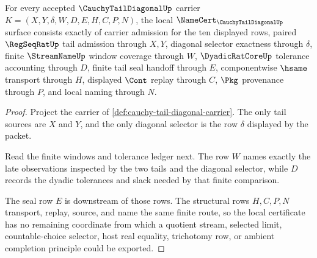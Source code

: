 \begin{theorem}\label{thm:cauchy-tail-diagonal-namecert-obligations}
For every accepted $\CauchyTailDiagonalUp$ carrier $K=(X,Y,\delta,W,D,E,H,C,P,N)$, the local $\NameCert_{\CauchyTailDiagonalUp}$ surface consists exactly of carrier admission for the ten displayed rows, paired $\RegSeqRatUp$ tail admission through $X,Y$, diagonal selector exactness through $\delta$, finite $\StreamNameUp$ window coverage through $W$, $\DyadicRatCoreUp$ tolerance accounting through $D$, finite tail seal handoff through $E$, componentwise $\hsame$ transport through $H$, displayed $\Cont$ replay through $C$, $\Pkg$ provenance through $P$, and local naming through $N$.
\end{theorem}
\begin{proof}
Project the carrier of \autoref{def:cauchy-tail-diagonal-carrier}. The only tail sources are $X$ and $Y$, and the only diagonal selector is the row $\delta$ displayed by the packet.

Read the finite windows and tolerance ledger next. The row $W$ names exactly the late observations inspected by the two tails and the diagonal selector, while $D$ records the dyadic tolerances and slack needed by that finite comparison.

The seal row $E$ is downstream of those rows. The structural rows $H,C,P,N$ transport, replay, source, and name the same finite route, so the local certificate has no remaining coordinate from which a quotient stream, selected limit, countable-choice selector, host real equality, trichotomy row, or ambient completion principle could be exported.
\end{proof}

